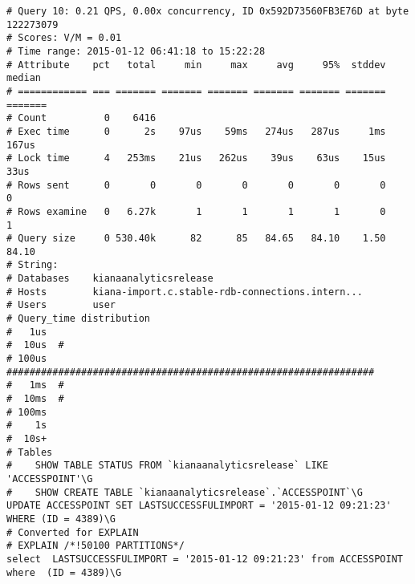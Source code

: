 \begin{appendix}
\begin{footnotesize}
\begin{verbatim}
# Query 10: 0.21 QPS, 0.00x concurrency, ID 0x592D73560FB3E76D at byte 122273079
# Scores: V/M = 0.01
# Time range: 2015-01-12 06:41:18 to 15:22:28
# Attribute    pct   total     min     max     avg     95%  stddev  median
# ============ === ======= ======= ======= ======= ======= ======= =======
# Count          0    6416
# Exec time      0      2s    97us    59ms   274us   287us     1ms   167us
# Lock time      4   253ms    21us   262us    39us    63us    15us    33us
# Rows sent      0       0       0       0       0       0       0       0
# Rows examine   0   6.27k       1       1       1       1       0       1
# Query size     0 530.40k      82      85   84.65   84.10    1.50   84.10
# String:
# Databases    kianaanalyticsrelease
# Hosts        kiana-import.c.stable-rdb-connections.intern...
# Users        user
# Query_time distribution
#   1us
#  10us  #
# 100us  ################################################################
#   1ms  #
#  10ms  #
# 100ms
#    1s
#  10s+
# Tables
#    SHOW TABLE STATUS FROM `kianaanalyticsrelease` LIKE 'ACCESSPOINT'\G
#    SHOW CREATE TABLE `kianaanalyticsrelease`.`ACCESSPOINT`\G
UPDATE ACCESSPOINT SET LASTSUCCESSFULIMPORT = '2015-01-12 09:21:23' WHERE (ID = 4389)\G
# Converted for EXPLAIN
# EXPLAIN /*!50100 PARTITIONS*/
select  LASTSUCCESSFULIMPORT = '2015-01-12 09:21:23' from ACCESSPOINT where  (ID = 4389)\G

\end{verbatim}
\end{footnotesize}
\end{appendix}
